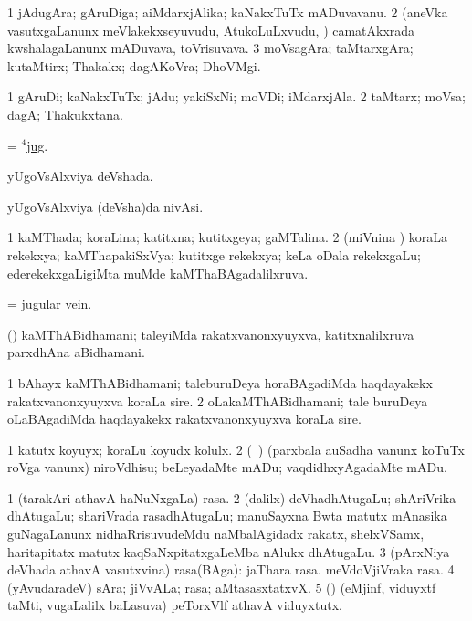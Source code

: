 \bentry
{}
\gl{\nA}
\bmng
\bnum
\num{1} jAdugAra; gAruDiga; aiMdarxjAlika; kaNakxTuTx mADuvavanu. 
\num{2} (aneVka vasutxgaLanunx meVlakekxseyuvudu, AtukoLuLxvudu, \mo) camatAkxrada kwshalagaLanunx mADuvava, toVrisuvava.   
\num{3} moVsagAra; taMtarxgAra; kutaMtirx; Thakakx; dagAKoVra; DhoVMgi. 
\enum
\emng
\eentry

\bentry
{}
\gl{\nA}
\bmng
\bnum
\num{1} gAruDi; kaNakxTuTx; jAdu; yakiSxNi; moVDi; iMdarxjAla. 
\num{2} taMtarx; moVsa; dagA; Thakukxtana. 
\enum
\emng
\eentry

\bentry
{}
\gl{\nA}
\bmng
 = \hyperlink{jug(4)}{$^4$jug}. 
\emng
\eentry

\bentry
{}
\gl{\gu}
\bmng
yUgoVsAlxviya deVshada. 
\emng
\eentry

\bentry
{}
\gl{\nA}
\bmng
yUgoVsAlxviya (deVsha)da nivAsi. 
\emng
\eentry

\bentry
{}
\gl{\gu}
\bmng
\bnum
\num{1} kaMThada; koraLina; katitxna; kutitxgeya; gaMTalina. 
\num{2} (miVnina \vi) koraLa rekekxya; kaMThapakiSxVya; kutitxge rekekxya; keLa oDala rekekxgaLu; ederekekxgaLigiMta muMde kaMThaBAgadalilxruva. 
\enum
\emng
\eentry


\bentry
{}
\gl{\nA}
\bmng
 = \hyperlink{jugular vein}{jugular vein}. 
\emng
\eentry

\bentry
{}
\gl{\nA}
\bmng
(\bava) kaMThABidhamani; taleyiMda rakatxvanonxyuyxva, katitxnalilxruva parxdhAna aBidhamani. 
\emng

\noindent
\gl{\pagu}
\bmng
\bnum
\num{1}  bAhayx kaMThABidhamani; taleburuDeya horaBAgadiMda haqdayakekx rakatxvanonxyuyxva koraLa sire. 
\num{2}  oLakaMThABidhamani; tale buruDeya oLaBAgadiMda haqdayakekx rakatxvanonxyuyxva koraLa sire. 
\enum
\emng
\eentry

\bentry
{}
\gl{\sakirx}
\bmng
\bnum
\num{1} katutx koyuyx; koraLu koyudx kolulx. 
\num{2} (\kanmu\ \rUpa) (parxbala auSadha \mo vanunx koTuTx roVga \mo vanunx) niroVdhisu; beLeyadaMte mADu; vaqdidhxyAgadaMte mADu. 
\enum
\emng
\eentry

\bentry
{}
\gl{\nA}
\bmng
\bnum
\num{1} (tarakAri athavA haNuNxgaLa) rasa. 
\num{2} (\bava dalilx) deVhadhAtugaLu; shAriVrika dhAtugaLu; shariVrada rasadhAtugaLu; manuSayxna Bwta matutx mAnasika guNagaLanunx nidhaRrisuvudeMdu naMbalAgidadx rakatx, shelxVSamx, haritapitatx matutx kaqSaNxpitatxgaLeMba nAlukx dhAtugaLu. 
\num{3} (pArxNiya deVhada athavA vasutxvina) rasa(BAga):  jaThara rasa.  meVdoVjiVraka rasa. 
\num{4} (yAvudaradeV) sAra; jiVvALa; rasa; aMtasasxtatxvX. 
\num{5} (\ashi) (eMjinf, viduyxtf taMti, \mo vugaLalilx baLasuva) peTorxVlf athavA viduyxtutx. 
\enum
\emng
\eentry

